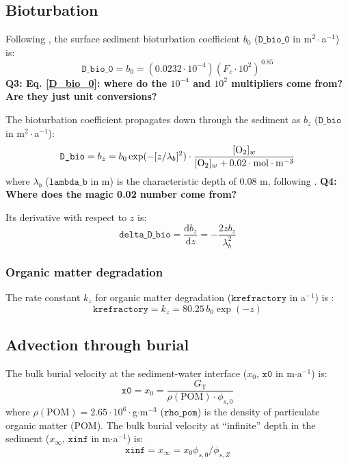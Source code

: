\documentclass[a4paper]{article}
\newcommand{\D}[1]{\mathrm{d}#1}
\newcommand{\code}[1]{\texttt{#1}}
\newcommand{\molmmm}{\mathrm{mol}\cdot\mathrm{m}^{-3}}
\newcommand{\wtf}[1]{\textcolor{Cerulean}{\textbf{#1}}}
\begin{document}
\subsection{Bioturbation}

Following \citet{archer_model_2002}, the surface sediment bioturbation coefficient $b_0$ ($\code{D\_bio\_0}$ in m$^2\cdot$a$^{-1}$) is:
\begin{equation}\label{D_bio_0}
\code{D\_bio\_0} = b_0 = (0.0232 \cdot 10^{-4}) (F_c \cdot 10^2)^{\,0.85}
\end{equation}
\wtf{Q3: Eq. \eqref{D_bio_0}: where do the $10^{-4}$ and $10^2$ multipliers come from? Are they just unit conversions?}

The bioturbation coefficient propagates down through the sediment as $b_z$ ($\code{D\_bio}$ in m$^2\cdot$a$^{-1}$):
\begin{equation}\label{B_z}
\code{D\_bio} = b_z = b_0 \exp(-[z/\lambda_b]^2) \cdot \frac{[\ce{O2}]_w}{[\ce{O2}]_w + 0.02 \cdot \molmmm}
\end{equation}
where $\lambda_b$ ($\code{lambda\_b}$ in m) is the characteristic depth of 0.08 m, following \citet{sayles_benthic_2001}.  \wtf{Q4: Where does the magic 0.02 number come from?}

Its derivative with respect to $z$ is:
\begin{equation}
\code{delta\_D\_bio} = \frac{\D{b_z}}{\D{z}} = - \frac{2 z b_z}{\lambda_b^2}
\end{equation}


\subsubsection{Organic matter degradation}

The rate constant $k_z$ for organic matter degradation ($\code{krefractory}$ in a$^{-1}$) is \citep{archer_model_2002}:
\begin{equation}\label{k_poc_degradation}
\code{krefractory} = k_z = 80.25 \, b_0 \exp(-z)
\end{equation}


\subsection{Advection through burial}

The bulk burial velocity at the sediment-water interface ($x_0$, $\code{x0}$ in m$\cdot$a$^{-1}$) is:
\begin{equation}
\code{x0} = x_0 = \frac{G_\mathrm{T}}{\rho(\mathrm{POM}) \cdot \phi_{s, 0}}
\end{equation}
where $\rho(\mathrm{POM}) = 2.65\cdot10^6\cdot$g$\cdot$m$^{-3}$ ($\code{rho\_pom}$) is the density of particulate organic matter (POM).  The bulk burial velocity at ``infinite'' depth in the sediment ($x_\infty$, $\code{xinf}$ in m$\cdot$a$^{-1}$) is:
\begin{equation}
\code{xinf} = x_\infty = x_0 \phi_{s,0} / \phi_{s,Z}
\end{equation}
\end{document}
